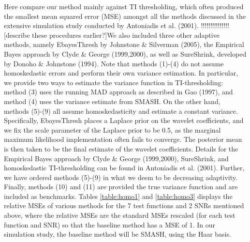 \documentclass[12pt]{article}
\begin{document}
Here compare our method mainly against TI thresholding, which often produced the smallest mean squared error (MSE) amongst all the methods discussed in the extensive simulation study conducted by Antoniadis et al. (2001). !!!!!!!!!!!!!!![describe these procedures earlier?]We also included three other adaptive methods, namely EbayesThresh by Johnstone \& Silverman (2005), the Empirical Bayes approach by Clyde \& George (1999,2000), as well as SureShrink, developed by Donoho \& Johnstone (1994). Note that methods (1)-(4) do not assume homoskedastic errors and perform their own variance estimation. In particular, we provide two ways to estimate the variance function in TI-thresholding: method (3) uses the running MAD approach as described in Gao (1997), and method (4) uses the variance estimate from SMASH. On the other hand, methods (5)-(9) all assume homoskedasticity and estimate a constant variance. Specifically, EbayesThresh places a Laplace prior on the wavelet coefficients, and we fix the scale parameter of the Laplace prior to be 0.5, as the marginal maximum likelihood implementation often fails to converge. The posterior mean is then taken to be the final estimate of the wavelet coefficients. Details for the Empirical Bayes approach by Clyde \& George (1999,2000), SureShrink, and homoskedastic TI-thresholding can be found in Antoniadis et al. (2001).  Further, we have ordered methods (5)-(9) in what we deem to be decreasing adaptivity. Finally, methods (10) and (11) are provided the true variance function and are included as benchmarks. Tables \ref{table:homo1} and \ref{table:homo3} displays the relative MSEs of various methods for the 7 test functions and 2 SNRs mentioned above, where the relative MSEs are the standard MSEs rescaled (for each test function and SNR) so that the baseline method has a MSE of 1. In our simulation study, the baseline method will be SMASH, using the Haar basis.
\end{document}
